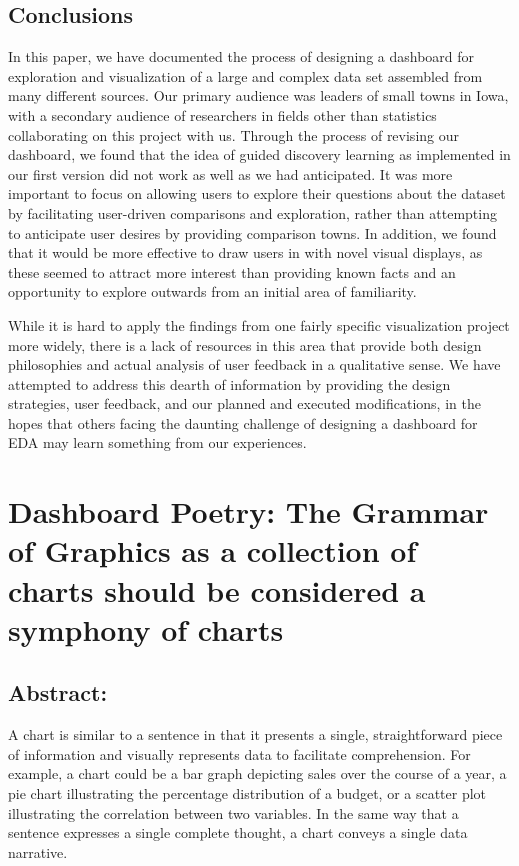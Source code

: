 \documentclass[print]{nuthesis}
\begin{document}
\hypertarget{conclusions}{%
\section{Conclusions}\label{conclusions}}

In this paper, we have documented the process of designing a dashboard for exploration and visualization of a large and complex data set assembled from many different sources. Our primary audience was leaders of small towns in Iowa, with a secondary audience of researchers in fields other than statistics collaborating on this project with us. Through the process of revising our dashboard, we found that the idea of guided discovery learning as implemented in our first version did not work as well as we had anticipated. It was more important to focus on allowing users to explore their questions about the dataset by facilitating user-driven comparisons and exploration, rather than attempting to anticipate user desires by providing comparison towns. In addition, we found that it would be more effective to draw users in with novel visual displays, as these seemed to attract more interest than providing known facts and an opportunity to explore outwards from an initial area of familiarity.

While it is hard to apply the findings from one fairly specific visualization project more widely, there is a lack of resources in this area that provide both design philosophies and actual analysis of user feedback in a qualitative sense. We have attempted to address this dearth of information by providing the design strategies, user feedback, and our planned and executed modifications, in the hopes that others facing the daunting challenge of designing a dashboard for EDA may learn something from our experiences.

\hypertarget{math-sci}{%
\chapter{Dashboard Poetry: The Grammar of Graphics as a collection of charts should be considered a symphony of charts}\label{math-sci}}

\hypertarget{abstract-1}{%
\section{Abstract:}\label{abstract-1}}

A chart is similar to a sentence in that it presents a single, straightforward piece of information and visually represents data to facilitate comprehension.
For example, a chart could be a bar graph depicting sales over the course of a year, a pie chart illustrating the percentage distribution of a budget, or a scatter plot illustrating the correlation between two variables.
In the same way that a sentence expresses a single complete thought, a chart conveys a single data narrative.
\end{document}
